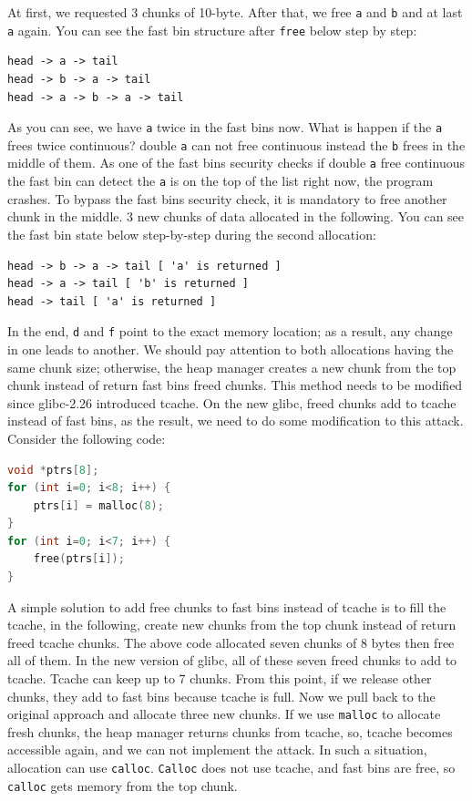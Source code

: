 \documentclass{masterthesis}
\newcommand*\libc{glibc}
\newcommand*\tch{tcache}
\newcommand*\fb{fast bins}
\newcommand*\Tch{Tcache\xspace}
\newcommand*\mallocc{\lstinline{malloc}\xspace}
\newcommand*\callocc{\lstinline{calloc}\xspace}
\newcommand*\Callocc{\lstinline{Calloc}\xspace}
\begin{document}
At first, we requested 3 chunks of 10-byte. After that, we free \lstinline{a} and \lstinline{b} and at last \lstinline{a} again. You can see the fast bin structure after \lstinline{free} below step by step:

\begin{lstlisting}[frame=tlrb]
head -> a -> tail
head -> b -> a -> tail
head -> a -> b -> a -> tail
\end{lstlisting}

As you can see, we have \lstinline{a} twice in the \fb{} now. What is happen if the \lstinline{a} frees twice continuous? double \lstinline{a} can not free continuous instead the \lstinline{b} frees in the middle of them. As one of the \fb{} security checks if double \lstinline{a} free continuous the fast bin can detect the \lstinline{a} is on the top of the list right now, the program crashes. To bypass the \fb{} security check, it is mandatory to free another chunk in the middle. 3 new chunks of data allocated in the following. You can see the fast bin state below step-by-step during the second allocation:

\begin{lstlisting}[frame=tlrb]
head -> b -> a -> tail [ 'a' is returned ]
head -> a -> tail [ 'b' is returned ]
head -> tail [ 'a' is returned ]
\end{lstlisting}

In the end, \lstinline{d} and \lstinline{f} point to the exact memory location; as a result, any change in one leads to another. We should pay attention to both allocations having the same chunk size; otherwise, the heap manager creates a new chunk from the top chunk instead of return \fb{} freed chunks.
This method needs to be modified since \libc{-2.26} introduced \tch{}. On the new \libc{}, freed chunks add to \tch{} instead of \fb{}, as the result, we need to do some modification to this attack. Consider the following code:

\begin{lstlisting}[language=c,frame=tlrb]
void *ptrs[8];
for (int i=0; i<8; i++) {
	ptrs[i] = malloc(8);
}
for (int i=0; i<7; i++) {
	free(ptrs[i]);
}
\end{lstlisting}

A simple solution to add free chunks to \fb{} instead of \tch{} is to fill the \tch{}, in the following, create new chunks from the top chunk instead of return freed \tch{} chunks. The above code allocated seven chunks of 8 bytes then free all of them. In the new version of \libc{}, all of these seven freed chunks to add to \tch{}. \Tch{} can keep up to 7 chunks. From this point, if we release other chunks, they add to \fb{} because \tch{} is full. Now we pull back to the original approach and allocate three new chunks. If we use \mallocc{} to allocate fresh chunks, the heap manager returns chunks from \tch{}, so, \tch{} becomes accessible again, and we can not implement the attack. In such a situation, allocation can use \callocc{}. \Callocc{} does not use \tch{}, and \fb{} are free, so \callocc{} gets memory from the top chunk.
\end{document}
